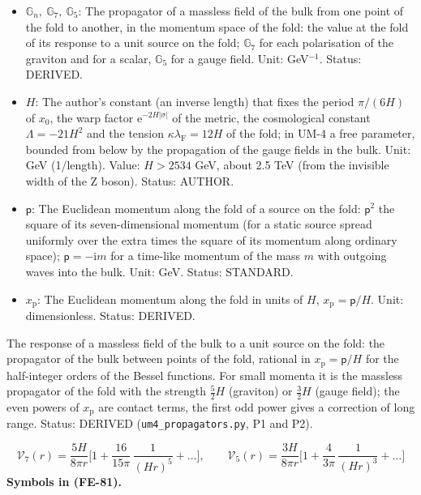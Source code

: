 \documentclass[
  10pt,
]{article}
\providecommand{\tightlist}{%
  \setlength{\itemsep}{0pt}\setlength{\parskip}{0pt}}
\begin{document}
\begin{itemize}
\tightlist
\item
  \(\mathbb{G}_n,\ \mathbb{G}_7,\ \mathbb{G}_5\): The propagator of a
  massless field of the bulk from one point of the fold to another, in
  the momentum space of the fold: the value at the fold of its response
  to a unit source on the fold; \(\mathbb{G}_7\) for each polarisation
  of the graviton and for a scalar, \(\mathbb{G}_5\) for a gauge field.
  Unit: GeV\(^{-1}\). Status: DERIVED.
\item
  \(H\): The author's constant (an inverse length) that fixes the period
  \(\pi/(6H)\) of \(x_0\), the warp factor
  \(\mathrm{e}^{-2H\lvert\sigma\rvert}\) of the metric, the cosmological
  constant \(\Lambda = -21H^2\) and the tension
  \(\kappa\lambda_{\mathrm{F}} = 12H\) of the fold; in UM-4 a free
  parameter, bounded from below by the propagation of the gauge fields
  in the bulk. Unit: GeV (1/length). Value: \(H > 2534\) GeV, about 2.5
  TeV (from the invisible width of the Z boson). Status: AUTHOR.
\item
  \(\mathsf{p}\): The Euclidean momentum along the fold of a source on
  the fold: \(\mathsf{p}^2\) the square of its seven-dimensional
  momentum (for a static source spread uniformly over the extra times
  the square of its momentum along ordinary space);
  \(\mathsf{p} = -\mathrm{i}m\) for a time-like momentum of the mass
  \(m\) with outgoing waves into the bulk. Unit: GeV. Status: STANDARD.
\item
  \(x_{\mathrm{p}}\): The Euclidean momentum along the fold in units of
  \(H\), \(x_{\mathrm{p}} = \mathsf{p}/H\). Unit: dimensionless. Status:
  DERIVED.
\end{itemize}

The response of a massless field of the bulk to a unit source on the
fold: the propagator of the bulk between points of the fold, rational in
\(x_{\mathrm{p}} = \mathsf{p}/H\) for the half-integer orders of the
Bessel functions. For small momenta it is the massless propagator of the
fold with the strength \(\frac52H\) (graviton) or \(\frac32H\) (gauge
field); the even powers of \(x_{\mathrm{p}}\) are contact terms, the
first odd power gives a correction of long range. Status: DERIVED
(\texttt{um4\_propagators.py}, P1 and P2).

\[
\mathcal{V}_7(r) = \frac{5H}{8\pi r}\Big[1 + \frac{16}{15\pi}\,\frac{1}{(Hr)^5} + \dots\Big],\qquad
\mathcal{V}_5(r) = \frac{3H}{8\pi r}\Big[1 + \frac{4}{3\pi}\,\frac{1}{(Hr)^3} + \dots\Big] \tag{FE-81}
\] \textbf{Symbols in (FE-81).}
\end{document}
